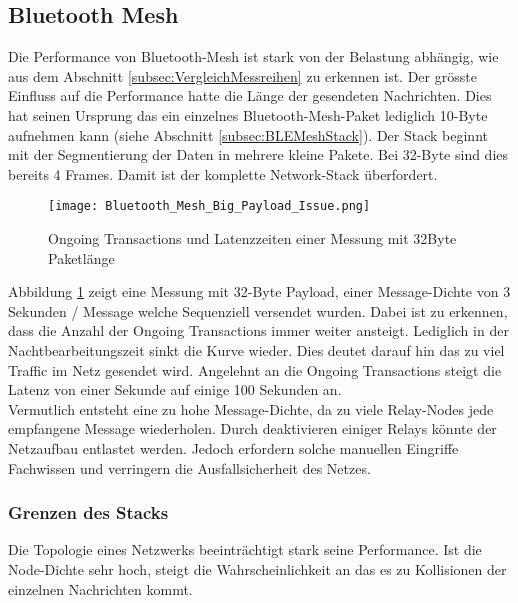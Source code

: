 
\subsection{Bluetooth Mesh}\label{subsec:Bluetooth_Mesh}

Die Performance von Bluetooth-Mesh ist stark von der Belastung abhängig, wie aus dem Abschnitt \ref{subsec:VergleichMessreihen} zu erkennen ist. Der grösste Einfluss auf die Performance hatte die Länge der gesendeten Nachrichten. Dies hat seinen Ursprung das ein einzelnes Bluetooth-Mesh-Paket lediglich 10-Byte aufnehmen kann (siehe Abschnitt \ref{subsec:BLEMeshStack}). Der Stack beginnt mit der Segmentierung der Daten in mehrere kleine Pakete. Bei 32-Byte sind dies bereits 4 Frames. Damit ist der komplette Network-Stack überfordert. 

\begin{figure}[H]
	\centering
	\texttt{[image: Bluetooth\_Mesh\_Big\_Payload\_Issue.png]}
	\caption{Ongoing Transactions und Latenzzeiten einer Messung mit 32Byte Paketlänge}\label{fig:Bluetooth_Mesh_Big_Payload_Issue}
\end{figure}

Abbildung \ref{fig:Bluetooth_Mesh_Big_Payload_Issue} zeigt eine Messung mit 32-Byte Payload, einer Message-Dichte von 3 Sekunden / Message welche Sequenziell versendet wurden. Dabei ist zu erkennen, dass die Anzahl der Ongoing Transactions immer weiter ansteigt. Lediglich in der Nachtbearbeitungszeit sinkt die Kurve wieder. Dies deutet darauf hin das zu viel Traffic im Netz gesendet wird. Angelehnt an die Ongoing Transactions steigt die Latenz von einer Sekunde auf einige 100 Sekunden an. \\

Vermutlich entsteht eine zu hohe Message-Dichte, da zu viele Relay-Nodes jede empfangene Message wiederholen. Durch deaktivieren einiger Relays könnte der Netzaufbau entlastet werden. Jedoch erfordern solche manuellen Eingriffe Fachwissen und verringern die Ausfallsicherheit des Netzes. 


\subsubsection{Grenzen des Stacks}\label{subsec:BLEMeshProtokollStack}

Die Topologie eines Netzwerks beeinträchtigt stark seine Performance. Ist die Node-Dichte sehr hoch, steigt die Wahrscheinlichkeit an das es zu Kollisionen der einzelnen Nachrichten kommt. 









